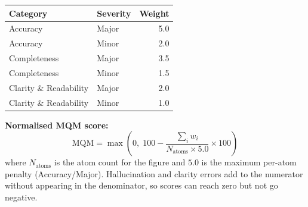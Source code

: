 \begin{minipage}[t]{0.48\textwidth}
\footnotesize

\label{tab:mqm-weights}
\centering
\begin{tabular}{@{}llr@{}}
\toprule
\textbf{Category} & \textbf{Severity} & \textbf{Weight} \\
\midrule
Accuracy            & Major & 5.0 \\
Accuracy            & Minor & 2.0 \\
Completeness        & Major & 3.5 \\
Completeness        & Minor & 1.5 \\
Clarity \& Readability & Major & 2.0 \\
Clarity \& Readability & Minor & 1.0 \\
\bottomrule
\end{tabular}

\vspace{6pt}
\noindent\textbf{Normalised MQM score:}
\[
\mathrm{MQM} = \max\!\left(0,\; 100 - \frac{\sum_{i} w_i}{N_{\mathrm{atoms}} \times 5.0} \times 100\right)
\]
where $N_{\mathrm{atoms}}$ is the atom count for the figure and $5.0$ is the maximum per-atom penalty (Accuracy/Major). Hallucination and clarity errors add to the numerator without appearing in the denominator, so scores can reach zero but not go negative.


\end{minipage}
